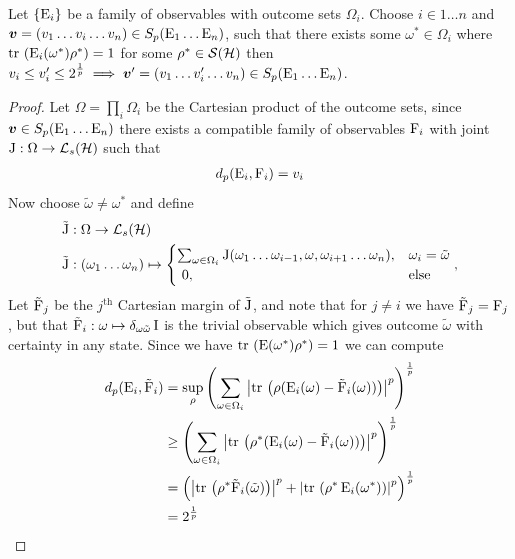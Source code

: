 \begin{lem}
  \label{lem:p-increase-error}
  Let $\{\operatorname{E}_i\}$ be a family of observables with outcome sets $\Omega_i$. Choose $i\in 1\hdots n$ and $\bm{v} = (v_1\hdots v_i\hdots v_n) \in S_p(\operatorname{E}_1\hdots\operatorname{E}_n)$, such that there exists some $\omega^*\in\Omega_i$ where $\tr{\ope_i(\omega^*)\rho^*} = 1$ for some $\rho^*\in\dops[\hcal]$ then $v_i \leq v_i^\prime \leq 2^{\frac{1}{p}} \implies \bm{v}^\prime = (v_1\hdots v_i^\prime\hdots v_n) \in S_p(\operatorname{E}_1\hdots\operatorname{E}_n)$.
  \begin{proof}
    Let $\Omega = \prod_i \Omega_i$ be the Cartesian product of the outcome sets, since $\bm{v}\in S_p(\operatorname{E}_1\hdots\operatorname{E}_n)$ there exists a compatible family of observables $\operatorname{F}_i$ with joint $\opj:\Omega\to\saops[\hcal]$ such that
    \begin{align}
      d_p(\operatorname{E}_i, \operatorname{F}_i) = v_i
    \end{align}
    Now choose $\tilde{\omega} \neq \omega^*$ and define
    \begin{align}
      \tilde{\opj}&:\Omega\to \saops[\hcal]\\
      \tilde{\opj}&:(\omega_1\hdots\omega_{n}) \mapsto \begin{cases}\sum_{\omega\in\Omega_i} \opj(\omega_1\hdots\omega_{i-1},\omega,\omega_{i+1}\hdots\omega_{n}), & \omega_i = \tilde{\omega}\\\ 0,&\text{else}\end{cases},
    \end{align}
    Let $\tilde{\operatorname{F}}_j$ be the $j^\text{th}$ Cartesian margin of $\tilde{\operatorname{J}}$, and note that for $j\neq i$ we have $\tilde{\operatorname{F}}_j = \operatorname{F}_j$, but that $\tilde{\operatorname{F}}_i:\omega\mapsto \delta_{\omega \tilde{\omega}}\operatorname{I}$ is the trivial observable which gives outcome $\tilde{\omega}$ with certainty in any state. Since we have $\tr{\ope(\omega^*)\rho^*} = 1$ we can compute %
    \begin{align}
      d_p(\ope_i,\tilde{\opf}_i) &= \sup_\rho\left(\sum_{\omega\in\Omega_i}\abs{\tr{\rho(\ope_i(\omega)- \tilde{\opf}_i(\omega))}}^p\right)^\frac{1}{p}\\
                                 &\geq \left(\sum_{\omega\in\Omega_i}\abs{\tr{\rho^*(\ope_i(\omega)- \tilde{\opf}_i(\omega))}}^p\right)^\frac{1}{p}\\
                                 &= \left(\abs{\tr{\rho^*\tilde{\opf}_i(\tilde{\omega})}}^p + \abs{\tr{\rho^*\ope_i(\omega^*)}}^p\right)^\frac{1}{p}\\
                                 &= 2^\frac{1}{p}
    \end{align}


\end{proof}
\end{lem}
